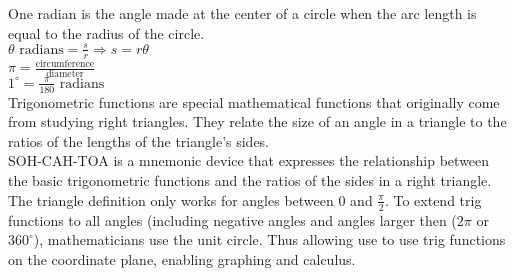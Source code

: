 \documentclass{article}
\begin{document}
One radian is the angle made at the center of a circle when the arc length is equal to the radius of the circle.\\

$\theta \text{ radians} = \frac{s}{r} \Rightarrow s = r\theta$\\

$\pi = \frac{\text{circumference}}{\text{diameter}}$\\

$1^\circ = \frac{\pi}{180} \text{ radians}$\\

Trigonometric functions are special mathematical functions that originally come from studying right triangles. They relate the size of an angle in a triangle to the ratios of the lengths of the triangle's sides.\\

SOH-CAH-TOA is a mnemonic device that expresses the relationship between the basic trigonometric functions and the ratios of the sides in a right triangle.\\

The triangle definition only works for angles between 0 and $\frac{\pi}{2}$. To extend trig functions to all angles (including negative angles and angles larger then ($2\pi$ or $360^{\circ}$), mathematicians use the unit circle. Thus allowing use to use trig functions on the coordinate plane, enabling graphing and calculus.\\	
\end{document}
